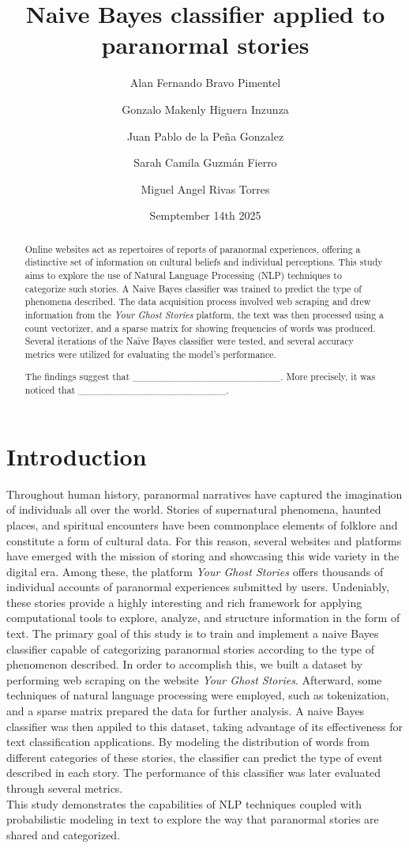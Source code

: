 \documentclass[twocolumn]{article}
\title{Naive Bayes classifier applied to paranormal stories}
\author{
Alan Fernando Bravo Pimentel \and
Gonzalo Makenly Higuera Inzunza \and
Juan Pablo de la Peña Gonzalez \and
Sarah Camila Guzmán Fierro \and
Miguel Angel Rivas Torres
}
\date{Semptember 14th 2025}
\begin{document}
\maketitle

\begin{abstract}
Online websites act as repertoires of reports of paranormal experiences, offering a distinctive set of information on cultural beliefs and individual perceptions. This study aims to  explore the use of Natural Language Processing (NLP) techniques to categorize such stories. A Naive Bayes classifier was trained to predict the type of phenomena described. The data acquisition process involved web scraping and drew information from the \textit{Your Ghost Stories} platform, the text was then processed using a count vectorizer, and a sparse matrix for showing frequencies of words was produced. Several iterations of the Naïve Bayes classifier were tested, and several accuracy metrics were utilized for evaluating the model's performance.  

The findings suggest that \_\_\_\_\_\_\_\_\_\_\_\_\_\_\_\_\_\_\_\_\_. More precisely, it was noticed that \_\_\_\_\_\_\_\_\_\_\_\_\_\_\_\_\_\_\_\_\_.  


\end{abstract}

\section{Introduction}
Throughout human history, paranormal narratives have captured the imagination of individuals all over the world. Stories of supernatural phenomena, haunted places, and spiritual encounters have been commonplace elements of folklore and constitute a form of cultural data. For this reason, several websites and platforms have emerged with the mission of storing and showcasing this wide variety in the digital era. Among these, the platform \textit{Your Ghost Stories} offers thousands of individual accounts of paranormal experiences submitted by users. Undeniably, these stories provide a highly interesting and rich framework for applying computational tools to explore, analyze, and structure information in the form of text.
The primary goal of this study is to train and implement a naive Bayes classifier capable of categorizing paranormal stories according to the type of phenomenon described. In order to accomplish this, we built a dataset by performing web scraping on the website \textit{Your Ghost Stories}. Afterward, some techniques of natural language processing were employed, such as tokenization, and a sparse matrix prepared the data for further analysis. 
A naive Bayes classifier was then appiled to this dataset, taking advantage of its effectiveness for text classification applications. By modeling the distribution of words from different categories of these stories, the classifier can predict the type of event described in each story. The performance of this classifier was later evaluated through several metrics. \\
This study demonstrates the capabilities of NLP techniques coupled with probabilistic modeling in text to explore the way that paranormal stories are shared and categorized.
\end{document}
